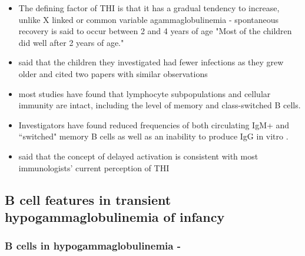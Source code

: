 \documentclass[12pt]{article}
\begin{document}
\begin{itemize}
\begin{enumerate}
				\end{enumerate}
				\item The defining factor of THI is that it has a gradual tendency to increase, unlike X linked or common variable agammaglobulinemia - spontaneous recovery is said to occur between 2 and 4 years of age \citep{Tiller78} "Most of the children did well after 2 years of age." \citep{McGeady87}
				\item \citet{McGeady87} said that the children they investigated had fewer infections as they grew older and cited two papers with similar observations
				\item most studies have found that lymphocyte subpopulations and cellular immunity are intact, including the level of memory and class-switched B cells. 
				\item Investigators have found reduced frequencies of both circulating IgM+ and ``switched" memory B cells as well as an inability to produce IgG in vitro \citep{Ovadia14}.
				\item \citet{McGeady87} said that the concept of delayed activation is consistent with most immunologists' current perception of THI
			\end{itemize} 
			
		\subsection{B cell features in transient hypogammaglobulinemia of infancy}
			
			\subsubsection{B cells in hypogammaglobulinemia - \citeauthor{Fiorilli86} \citeyear{Fiorilli86}}
			
			  
				
\end{document}
